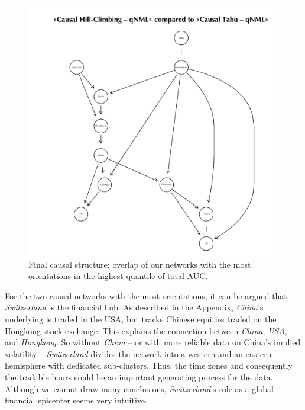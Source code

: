 \documentclass[twoside,twocolumn]{article}
\begin{document}
\begin{figure}[H]
\centering
  \includegraphics[trim={0 0 0 0},clip, height=0.72\textwidth]{../1. Code/Implied Volatility/Exports/Networks/Causal/Final Causal}
  \caption[Final causal structure]{Final causal structure: overlap of our networks with the most orientations in the highest quantile of total AUC.}
  \label{fig:finalcausal}
\end{figure}

For the two causal networks with the most orientations, it can be argued that \textsl{Switzerland} is the financial hub. As described in the Appendix, \textsl{China}'s underlying is traded in the USA, but tracks Chinese equities traded on the Hongkong stock exchange. This explains the connection between \textsl{China}, \textsl{USA}, and \textsl{Hongkong}. So without \textsl{China} -- or with more reliable data on China's implied volatility --  \textsl{Switzerland} divides the network into a western and an eastern hemisphere with dedicated sub-clusters. Thus, the time zones and consequently the tradable hours could be an important generating process for the data. 
Although we cannot draw many conclusions, \textsl{Switzerland}'s role as a global financial epicenter seems very intuitive.
\newpage
\end{document}

